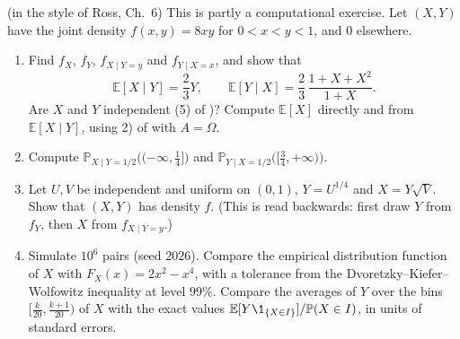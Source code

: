 \begin{exercise}\label{ex:ce-joint-density}
\medium (in the style of Ross, Ch.~6) This is partly a computational exercise. Let $(X,Y)$ have
the joint density $f(x,y)=8xy$ for $0<x<y<1$, and $0$ elsewhere.
\begin{enumerate}[label=(\alph*)]
  \item Find $f_X$, $f_Y$, $f_{X\mid Y=y}$ and $f_{Y\mid X=x}$, and show that
    \[
      \mathbb E[X\mid Y]=\frac23Y,\qquad\mathbb E[Y\mid X]=\frac23\,\frac{1+X+X^2}{1+X}.
    \]
    Are $X$ and $Y$ independent (5) of )? Compute
    $\mathbb E[X]$ directly and from $\mathbb E[X\mid Y]$, using 2) of
     with $A=\Omega$.
  \item Compute $\mathbb P_{X\mid Y=1/2}\big((-\infty,\frac14]\big)$ and
    $\mathbb P_{Y\mid X=1/2}\big([\frac34,+\infty)\big)$.
  \item Let $U,V$ be independent and uniform on $(0,1)$, $Y=U^{1/4}$ and $X=Y\sqrt V$. Show
    that $(X,Y)$ has density $f$. (This is  read backwards:
    first draw $Y$ from $f_Y$, then $X$ from $f_{X\mid Y=y}$.)
  \item Simulate $10^6$ pairs (seed $2026$). Compare the empirical distribution function of $X$
    with $F_X(x)=2x^2-x^4$, with a tolerance from the Dvoretzky--Kiefer--Wolfowitz inequality
    at level $99\%$. Compare the averages of $Y$ over the bins $[\frac{k}{20},\frac{k+1}{20})$
    of $X$ with the exact values $\mathbb E[Y\1_{\{X\in I\}}]/\mathbb P(X\in I)$, in units of
    standard errors.
\end{enumerate}
\end{exercise}

